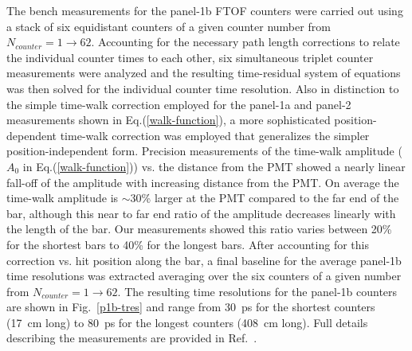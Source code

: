 \documentclass{elsart}
\begin{document}
The bench measurements for the panel-1b FTOF counters were carried out using a stack of six
equidistant counters of a given counter number from $N_{counter} = 1 \to 62$. Accounting for the
necessary path length corrections to relate the individual counter times to each other, six simultaneous
triplet counter measurements were analyzed and the resulting time-residual system of equations was then
solved for the individual counter time resolution. Also in distinction to the simple time-walk correction
employed for the panel-1a and panel-2 measurements shown in Eq.(\ref{walk-function}), a more sophisticated
position-dependent time-walk correction was employed that generalizes the simpler position-independent form.
Precision measurements of the time-walk amplitude ($A_0$ in Eq.(\ref{walk-function})) vs. the distance from
the PMT showed a nearly linear fall-off of the amplitude with increasing distance from the PMT. On average
the time-walk amplitude is $\sim$30\% larger at the PMT compared to the far end of the bar, although this
near to far end ratio of the amplitude decreases linearly with the length of the bar. Our measurements
showed this ratio varies between 20\% for the shortest bars to 40\% for the longest bars. After accounting
for this correction vs. hit position along the bar, a final baseline for the average panel-1b time resolutions was
extracted averaging over the six counters of a given number from $N_{counter} = 1 \to 62$. The resulting time
resolutions for the panel-1b counters are shown in Fig.~\ref{p1b-tres} and range from 30~ps for the shortest
counters  (17~cm long) to 80~ps for the longest counters (408~cm long). Full details describing the
measurements are provided in Ref.~\cite{nim-p1b}.
\end{document}
